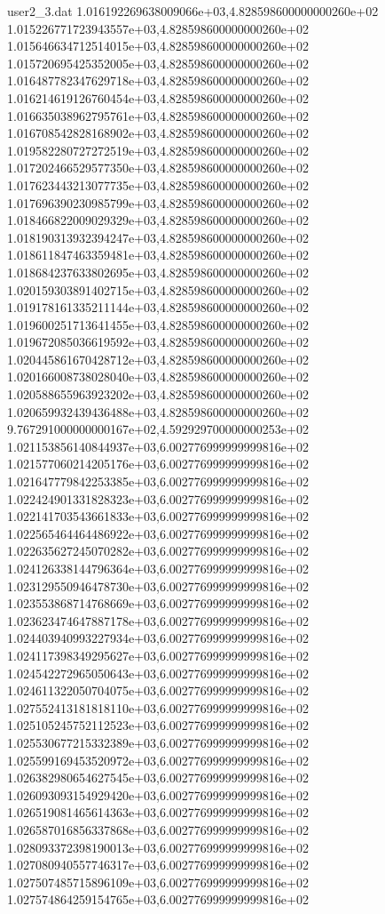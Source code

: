 \begin{filecontents}{user2_3.dat}
1.016192269638009066e+03,4.828598600000000260e+02
1.015226771723943557e+03,4.828598600000000260e+02
1.015646634712514015e+03,4.828598600000000260e+02
1.015720695425352005e+03,4.828598600000000260e+02
1.016487782347629718e+03,4.828598600000000260e+02
1.016214619126760454e+03,4.828598600000000260e+02
1.016635038962795761e+03,4.828598600000000260e+02
1.016708542828168902e+03,4.828598600000000260e+02
1.019582280727272519e+03,4.828598600000000260e+02
1.017202466529577350e+03,4.828598600000000260e+02
1.017623443213077735e+03,4.828598600000000260e+02
1.017696390230985799e+03,4.828598600000000260e+02
1.018466822009029329e+03,4.828598600000000260e+02
1.018190313932394247e+03,4.828598600000000260e+02
1.018611847463359481e+03,4.828598600000000260e+02
1.018684237633802695e+03,4.828598600000000260e+02
1.020159303891402715e+03,4.828598600000000260e+02
1.019178161335211144e+03,4.828598600000000260e+02
1.019600251713641455e+03,4.828598600000000260e+02
1.019672085036619592e+03,4.828598600000000260e+02
1.020445861670428712e+03,4.828598600000000260e+02
1.020166008738028040e+03,4.828598600000000260e+02
1.020588655963923202e+03,4.828598600000000260e+02
1.020659932439436488e+03,4.828598600000000260e+02
9.767291000000000167e+02,4.592929700000000253e+02
1.021153856140844937e+03,6.002776999999999816e+02
1.021577060214205176e+03,6.002776999999999816e+02
1.021647779842253385e+03,6.002776999999999816e+02
1.022424901331828323e+03,6.002776999999999816e+02
1.022141703543661833e+03,6.002776999999999816e+02
1.022565464464486922e+03,6.002776999999999816e+02
1.022635627245070282e+03,6.002776999999999816e+02
1.024126338144796364e+03,6.002776999999999816e+02
1.023129550946478730e+03,6.002776999999999816e+02
1.023553868714768669e+03,6.002776999999999816e+02
1.023623474647887178e+03,6.002776999999999816e+02
1.024403940993227934e+03,6.002776999999999816e+02
1.024117398349295627e+03,6.002776999999999816e+02
1.024542272965050643e+03,6.002776999999999816e+02
1.024611322050704075e+03,6.002776999999999816e+02
1.027552413181818110e+03,6.002776999999999816e+02
1.025105245752112523e+03,6.002776999999999816e+02
1.025530677215332389e+03,6.002776999999999816e+02
1.025599169453520972e+03,6.002776999999999816e+02
1.026382980654627545e+03,6.002776999999999816e+02
1.026093093154929420e+03,6.002776999999999816e+02
1.026519081465614363e+03,6.002776999999999816e+02
1.026587016856337868e+03,6.002776999999999816e+02
1.028093372398190013e+03,6.002776999999999816e+02
1.027080940557746317e+03,6.002776999999999816e+02
1.027507485715896109e+03,6.002776999999999816e+02
1.027574864259154765e+03,6.002776999999999816e+02

\end{filecontents}
